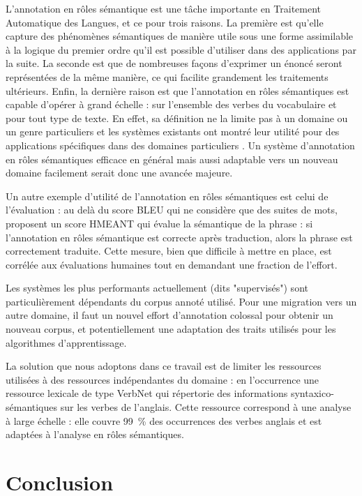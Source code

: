 \documentclass[oneside,parskip]{scrbook}
\begin{document}
L'annotation en rôles sémantique est une tâche importante en Traitement
Automatique des Langues, et ce pour trois raisons. La première est qu'elle
capture des phénomènes sémantiques de manière utile sous une forme assimilable
à la logique du premier ordre qu'il est possible d'utiliser dans des
applications par la suite. La seconde est que de nombreuses façons d'exprimer
un énoncé seront représentées de la même manière, ce qui facilite grandement
les traitements ultérieurs. Enfin, la dernière raison est que l'annotation en
rôles sémantiques est capable d'opérer à grand échelle : sur l'ensemble des
verbes du vocabulaire et pour tout type de texte. En effet, sa définition ne la
limite pas à un domaine ou un genre particuliers et les systèmes existants ont
montré leur utilité pour des applications spécifiques dans des domaines
particuliers \citep{osman2012improved,xie2013semantic}. Un système
d'annotation en rôles sémantiques efficace en général mais aussi adaptable vers
un nouveau domaine facilement serait donc une avancée majeure.

Un autre exemple d'utilité de l'annotation en rôles sémantiques est celui de
l'évaluation : au delà du score BLEU qui ne considère que des suites de mots,
\cite{lo2011smt} proposent un score HMEANT qui évalue la sémantique de la
phrase : si l'annotation en rôles sémantique est correcte après traduction,
alors la phrase est correctement traduite. Cette mesure, bien que difficile à
mettre en place, est corrélée aux évaluations humaines tout en demandant une
fraction de l'effort.

Les systèmes les plus performants actuellement (dits "supervisés") sont
particulièrement dépendants du corpus annoté utilisé. Pour une migration vers
un autre domaine, il faut un nouvel effort d'annotation colossal pour obtenir
un nouveau corpus, et potentiellement une adaptation des traits utilisés pour
les algorithmes d'apprentissage.

La solution que nous adoptons dans ce travail est de limiter les ressources
utilisées à des ressources indépendantes du domaine : en l'occurrence une
ressource lexicale de type VerbNet qui répertorie des informations
syntaxico-sémantiques sur les verbes de l'anglais. Cette ressource correspond à
une analyse à large échelle : elle couvre 99~\% des occurrences des verbes
anglais \citep[partie 1, p~.53]{palmer2013semantic} et est adaptées à l'analyse
en rôles sémantiques.







\chapter{Conclusion}
\label{ch:conc}

\backmatter





\end{document}
